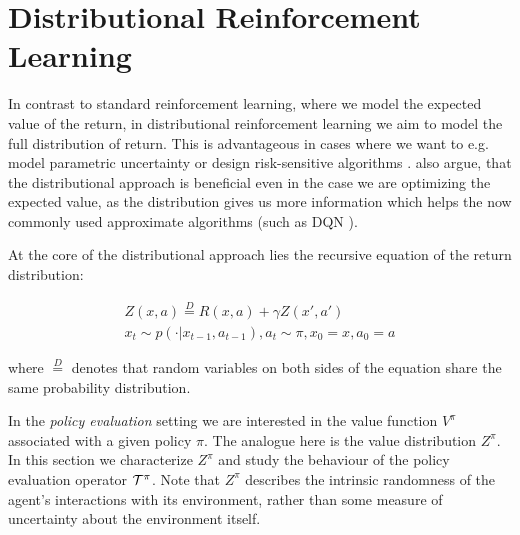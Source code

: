 

\section{Distributional Reinforcement Learning}\label{sec:prelim:distrl}

In contrast to standard reinforcement learning, where we model the expected value of the return, in distributional reinforcement learning \cite{many} we aim to model the full distribution of return. This is advantageous in cases where we want to e.g. model parametric uncertainty \cite{...} or design risk-sensitive algorithms \citep{morimura2012parametric}\citep{morimura2010nonparametric}. \citet{bellemare2017distributional} also argue, that the distributional approach is beneficial even in the case we are optimizing the expected value, as the distribution gives us more information which helps the now commonly used approximate algorithms (such as DQN \citep{mnih2015human}).

At the core of the distributional approach lies the recursive equation of the return distribution:

\begin{equation}
\begin{split}
Z(x, a) \overset{D}{=} R(x, a) + \gamma Z(x', a')\\
x_t \sim p(\cdot|x_{t-1}, a_{t-1}), a_t \sim \pi, x_0 = x, a_0 = a
\end{split}
\end{equation}

where $\overset{D}{=}$ denotes that random variables on both sides of the equation share the same probability distribution.

In the \emph{policy evaluation} setting \citep{sutton1998reinforcement} we are interested in the value function $V^\pi$ associated with a given policy $\pi$. The analogue here is the value distribution $Z^\pi$. In this section we characterize $Z^\pi$ and study the behaviour of the policy evaluation operator $\mathcal{T}^\pi$. Note that $Z^\pi$ describes the intrinsic randomness of the agent's interactions with its environment, rather than some measure of uncertainty about the environment itself.
%

